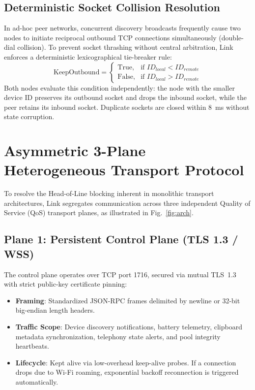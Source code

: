 \documentclass[conference]{IEEEtran}
\begin{document}
\subsection{Deterministic Socket Collision Resolution}
In ad-hoc peer networks, concurrent discovery broadcasts frequently cause two nodes to initiate reciprocal outbound TCP connections simultaneously (double-dial collision). To prevent socket thrashing without central arbitration, Link enforces a deterministic lexicographical tie-breaker rule:
\begin{equation}
\text{KeepOutbound} = \begin{cases} \text{True}, & \text{if } ID_{local} < ID_{remote} \\ \text{False}, & \text{if } ID_{local} > ID_{remote} \end{cases}
\end{equation}
Both nodes evaluate this condition independently: the node with the smaller device ID preserves its outbound socket and drops the inbound socket, while the peer retains its inbound socket. Duplicate sockets are closed within 8~ms without state corruption.

\section{Asymmetric 3-Plane Heterogeneous Transport Protocol}
\label{sec:transport}

To resolve the Head-of-Line blocking inherent in monolithic transport architectures, Link segregates communication across three independent Quality of Service (QoS) transport planes, as illustrated in Fig.~\ref{fig:arch}.

\subsection{Plane 1: Persistent Control Plane (TLS 1.3 / WSS)}
The control plane operates over TCP port 1716, secured via mutual TLS~1.3 with strict public-key certificate pinning:
\begin{itemize}
    \item \textbf{Framing}: Standardized JSON-RPC frames delimited by newline or 32-bit big-endian length headers.
    \item \textbf{Traffic Scope}: Device discovery notifications, battery telemetry, clipboard metadata synchronization, telephony state alerts, and pool integrity heartbeats.
    \item \textbf{Lifecycle}: Kept alive via low-overhead keep-alive probes. If a connection drops due to Wi-Fi roaming, exponential backoff reconnection is triggered automatically.
\end{itemize}
\end{document}
